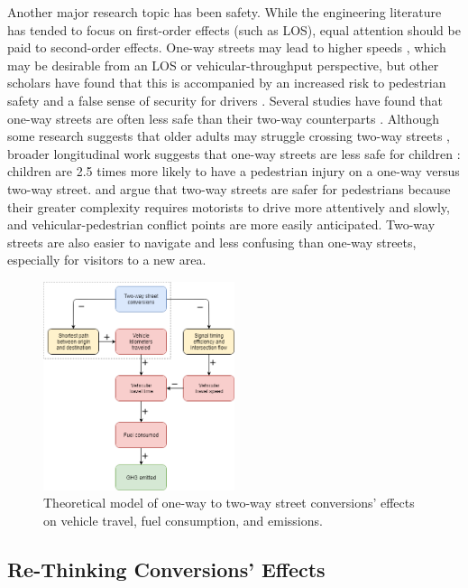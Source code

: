 \documentclass{trbunofficial}
\begin{document}
Another major research topic has been safety. While the engineering literature has tended to focus on first-order effects (such as LOS), equal attention should be paid to second-order effects. One-way streets may lead to higher speeds \cite{schneider_pedestrian_2013}, which may be desirable from an LOS or vehicular-throughput perspective, but other scholars have found that this is accompanied by an increased risk to pedestrian safety \cite{swift_residential_1998} and a false sense of security for drivers \cite{holahan_psychological_2013}. Several studies have found that one-way streets are often less safe than their two-way counterparts \cite{ewing_urban_2003,riggs_two-way_2016,ewing_built_2009}. Although some research suggests that older adults may struggle crossing two-way streets \cite{dommes_functional_2013}, broader longitudinal work suggests that one-way streets are less safe for children \cite{wazana_are_2000}: children are 2.5 times more likely to have a pedestrian injury on a one-way versus two-way street. \citet{gayah_two-way_2012} and \citet{gayah_analytical_2012} argue that two-way streets are safer for pedestrians because their greater complexity requires motorists to drive more attentively and slowly, and vehicular-pedestrian conflict points are more easily anticipated. Two-way streets are also easier to navigate and less confusing than one-way streets, especially for visitors to a new area.

\begin{figure}[tbp]
	\centering
	\includegraphics[width=0.5\textwidth]{figures/conversions_ghg.png}
	\caption{Theoretical model of one-way to two-way street conversions' effects on vehicle travel, fuel consumption, and emissions.}
	\label{fig:conversions_ghg}
\end{figure}

\subsection{Re-Thinking Conversions' Effects}
\end{document}
